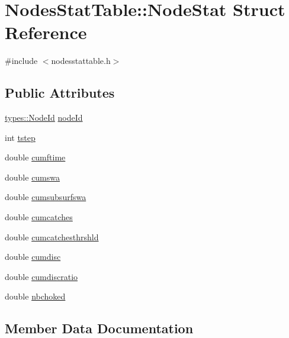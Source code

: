 \hypertarget{struct_nodes_stat_table_1_1_node_stat}{}\section{Nodes\+Stat\+Table\+::Node\+Stat Struct Reference}
\label{struct_nodes_stat_table_1_1_node_stat}


{\ttfamily \#include $<$nodesstattable.\+h$>$}

\subsection*{Public Attributes}
\begin{DoxyCompactItemize}
\item 
\mbox{\hyperlink{classtypes_1_1_node_id}{types\+::\+Node\+Id}} \mbox{\hyperlink{struct_nodes_stat_table_1_1_node_stat_af9ea7227739e94e110bc64ee515e51f4}{node\+Id}}
\item 
int \mbox{\hyperlink{struct_nodes_stat_table_1_1_node_stat_a5a78dbc669fcda8d8ea42075b286c749}{tstep}}
\item 
double \mbox{\hyperlink{struct_nodes_stat_table_1_1_node_stat_a5637326d811a6dc957248bee9c7bd2f7}{cumftime}}
\item 
double \mbox{\hyperlink{struct_nodes_stat_table_1_1_node_stat_a6fe04cb8e14d6e84491a765749ef035a}{cumswa}}
\item 
double \mbox{\hyperlink{struct_nodes_stat_table_1_1_node_stat_a32ac2b88a037e8f52ef416ef99cb81c7}{cumsubsurfswa}}
\item 
double \mbox{\hyperlink{struct_nodes_stat_table_1_1_node_stat_a059109bdea9766a6824461052419643f}{cumcatches}}
\item 
double \mbox{\hyperlink{struct_nodes_stat_table_1_1_node_stat_ab8936112348eff18240d155992e307ce}{cumcatchesthrshld}}
\item 
double \mbox{\hyperlink{struct_nodes_stat_table_1_1_node_stat_af22ec308c5f23f086657a281765d91a4}{cumdisc}}
\item 
double \mbox{\hyperlink{struct_nodes_stat_table_1_1_node_stat_a9ce71f712af61049451f335d402adc53}{cumdiscratio}}
\item 
double \mbox{\hyperlink{struct_nodes_stat_table_1_1_node_stat_a3196699dbd468de6782e70ab0ac6f68c}{nbchoked}}
\end{DoxyCompactItemize}


\subsection{Member Data Documentation}
\mbox{\label{struct_nodes_stat_table_1_1_node_stat_a059109bdea9766a6824461052419643f}} 
